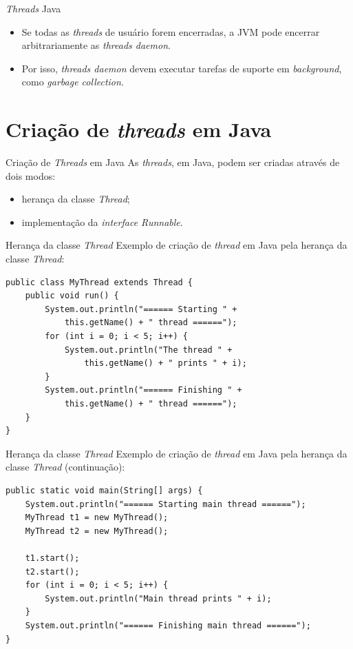 \documentclass[11pt,justified]{beamer}
\begin{document}
\begin{frame}{\textit{Threads} Java}
    \begin{itemize}
        \item Se todas as \textit{threads} de usuário forem encerradas, a JVM pode encerrar arbitrariamente as \textit{threads daemon}.
        \item Por isso, \textit{threads daemon} devem executar tarefas de suporte em \textit{background}, como \textit{garbage collection}.
    \end{itemize}
\end{frame}

\section{Criação de \textit{threads} em Java}

\begin{frame}{Criação de \textit{Threads} em Java}
    As \textit{threads}, em Java, podem ser criadas através de dois modos:
    \begin{itemize}
        \item herança da classe \textit{Thread};
        \item implementação da \textit{interface Runnable}.
    \end{itemize}
\end{frame}

\begin{frame}[fragile]{Herança da classe \textit{Thread}}
    Exemplo de criação de \textit{thread} em Java pela herança da classe \textit{Thread}:
    \begin{lstlisting}
public class MyThread extends Thread {
    public void run() {
        System.out.println("====== Starting " + 
            this.getName() + " thread ======");
        for (int i = 0; i < 5; i++) {
            System.out.println("The thread " + 
                this.getName() + " prints " + i);
        }
        System.out.println("====== Finishing " + 
            this.getName() + " thread ======");
    }
}
    \end{lstlisting}
\end{frame}

\begin{frame}[fragile]{Herança da classe \textit{Thread}}
    Exemplo de criação de \textit{thread} em Java pela herança da classe \textit{Thread} (continuação):
    \begin{lstlisting}
public static void main(String[] args) {
    System.out.println("====== Starting main thread ======");
    MyThread t1 = new MyThread();
    MyThread t2 = new MyThread();
    
    t1.start();
    t2.start();
    for (int i = 0; i < 5; i++) {
        System.out.println("Main thread prints " + i);
    }
    System.out.println("====== Finishing main thread ======");
}
    \end{lstlisting}
\end{frame}
\end{document}
